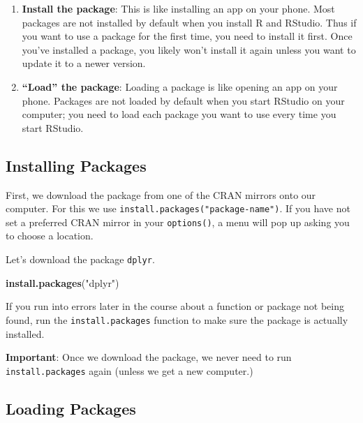 \documentclass[]{book}
\newenvironment{Shaded}{\begin{snugshade}}{\end{snugshade}}
\newcommand{\KeywordTok}[1]{\textcolor[rgb]{0.13,0.29,0.53}{\textbf{#1}}}
\newcommand{\NormalTok}[1]{#1}
\newcommand{\StringTok}[1]{\textcolor[rgb]{0.31,0.60,0.02}{#1}}
\providecommand{\tightlist}{%
  \setlength{\itemsep}{0pt}\setlength{\parskip}{0pt}}
\begin{document}
\begin{enumerate}
\def\labelenumi{\arabic{enumi}.}
\tightlist
\item
  \textbf{Install the package}: This is like installing an app on your phone. Most packages are not installed by default when you install R and RStudio. Thus if you want to use a package for the first time, you need to install it first. Once you've installed a package, you likely won't install it again unless you want to update it to a newer version.
\item
  \textbf{``Load'' the package}: Loading a package is like opening an app on your phone. Packages are not loaded by default when you start RStudio on your computer; you need to load each package you want to use every time you start RStudio.
\end{enumerate}

\hypertarget{installing-packages}{%
\subsection{Installing Packages}\label{installing-packages}}

First, we download the package from one of the CRAN mirrors onto our computer. For this we use \texttt{install.packages("package-name")}. If you have not set a preferred CRAN mirror in your \texttt{options()}, a menu will pop up asking you to choose a location.

Let's download the package \texttt{dplyr}.

\begin{Shaded}
\begin{Highlighting}[]
\KeywordTok{install.packages}\NormalTok{(}\StringTok{"dplyr"}\NormalTok{)}
\end{Highlighting}
\end{Shaded}

If you run into errors later in the course about a function or package not being found, run the \texttt{install.packages} function to make sure the package is actually installed.

\textbf{Important}: Once we download the package, we never need to run \texttt{install.packages} again (unless we get a new computer.)

\hypertarget{loading-packages}{%
\subsection{Loading Packages}\label{loading-packages}}
\end{document}

